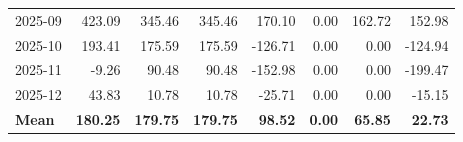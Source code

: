 \begin{table}[h]
\begin{tabular}{lrrrrrrr}
2025-09 & 423.09 & 345.46 & 345.46 & 170.10 & 0.00 & 162.72 & 152.98 \\
2025-10 & 193.41 & 175.59 & 175.59 & -126.71 & 0.00 & 0.00 & -124.94 \\
2025-11 & -9.26 & 90.48 & 90.48 & -152.98 & 0.00 & 0.00 & -199.47 \\
2025-12 & 43.83 & 10.78 & 10.78 & -25.71 & 0.00 & 0.00 & -15.15 \\
\midrule
\textbf{Mean} & \textbf{180.25} & \textbf{179.75} & \textbf{179.75} & \textbf{98.52} & \textbf{0.00} & \textbf{65.85} & \textbf{22.73} \\
\bottomrule
\end{tabular}
\end{table}
